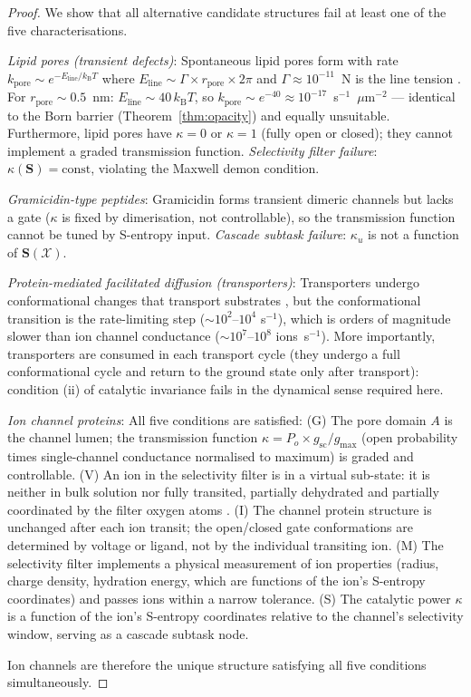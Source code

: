 \documentclass[11pt,twocolumn,a4paper]{article}
\theoremstyle{definition}
\theoremstyle{remark}
\newcommand{\kB}{k_{\mathrm{B}}}
\newcommand{\kap}{\kappa}
\newcommand{\Sent}{\bm{S}}
\begin{document}
\begin{proof}
We show that all alternative candidate structures fail at least one of the
five characterisations.

\textit{Lipid pores (transient defects)}: Spontaneous lipid pores form with
rate $k_{\mathrm{pore}} \sim e^{-E_{\mathrm{line}}/\kB T}$ where
$E_{\mathrm{line}} \sim \Gamma \times r_{\mathrm{pore}} \times 2\pi$
and $\Gamma \approx 10^{-11}$~N is the line tension \citep{taupin1975}.
For $r_{\mathrm{pore}} \sim 0.5$~nm: $E_{\mathrm{line}} \sim 40\,\kB T$,
so $k_{\mathrm{pore}} \sim e^{-40} \approx 10^{-17}$~s$^{-1}$~$\mu$m$^{-2}$
--- identical to the Born barrier (Theorem~\ref{thm:opacity}) and equally
unsuitable. Furthermore, lipid pores have $\kap = 0$ or $\kap = 1$ (fully
open or closed); they cannot implement a graded transmission function.
\textit{Selectivity filter failure}: $\kap(\Sent) = \mathrm{const}$,
violating the Maxwell demon condition.

\textit{Gramicidin-type peptides}: Gramicidin forms transient dimeric channels
\citep{urry1971} but lacks a gate ($\kap$ is fixed by dimerisation, not
controllable), so the transmission function cannot be tuned by S-entropy input.
\textit{Cascade subtask failure}: $\kap_u$ is not a function of $\Sent(\mathcal{X})$.

\textit{Protein-mediated facilitated diffusion (transporters)}: Transporters
undergo conformational changes that transport substrates \citep{jardetzky1966},
but the conformational transition is the rate-limiting step ($\sim 10^2$--$10^4$
s$^{-1}$), which is orders of magnitude slower than ion channel conductance
($\sim 10^7$--$10^8$ ions~s$^{-1}$). More importantly, transporters are
consumed in each transport cycle (they undergo a full conformational cycle and
return to the ground state only after transport): condition (ii) of catalytic
invariance fails in the dynamical sense required here.

\textit{Ion channel proteins}: All five conditions are satisfied:
(G) The pore domain $A$ is the channel lumen; the transmission function
$\kap = P_o \times g_{\mathrm{sc}} / g_{\mathrm{max}}$ (open probability times
single-channel conductance normalised to maximum) is graded and controllable.
(V) An ion in the selectivity filter is in a virtual sub-state: it is neither
in bulk solution nor fully transited, partially dehydrated and partially
coordinated by the filter oxygen atoms \citep{doyle1998}.
(I) The channel protein structure is unchanged after each ion transit; the
open/closed gate conformations are determined by voltage or ligand, not by
the individual transiting ion.
(M) The selectivity filter implements a physical measurement of ion properties
(radius, charge density, hydration energy, which are functions of the ion's
S-entropy coordinates) and passes ions within a narrow tolerance.
(S) The catalytic power $\kap$ is a function of the ion's S-entropy coordinates
relative to the channel's selectivity window, serving as a cascade subtask node.

Ion channels are therefore the unique structure satisfying all five conditions
simultaneously.
\end{proof}
\end{document}
